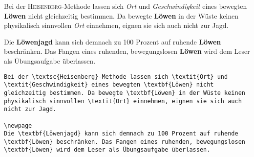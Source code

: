 \begin{frame}[fragile]
	\Losung
	\begin{outputbox}
		Bei der \textsc{Heisenberg}-Methode lassen sich \textit{Ort} und \textit{Geschwindigkeit} eines bewegten \textbf{Löwen} nicht gleichzeitig bestimmen. Da bewegte \textbf{Löwen} in der Wüste keinen physikalisch sinnvollen \textit{Ort} einnehmen, eignen sie sich auch nicht zur Jagd. 
	\end{outputbox}
    \linebreakrule
	\begin{outputbox}
		Die \textbf{Löwenjagd} kann sich demnach zu 100 Prozent auf ruhende \textbf{Löwen} beschränken. Das Fangen eines ruhenden, bewegungslosen \textbf{Löwen} wird dem Leser als Übungsaufgabe überlassen.
	\end{outputbox}

	\Code\btVFill
	\begin{lstlisting}
Bei der \textsc{Heisenberg}-Methode lassen sich \textit{Ort} und \textit{Geschwindigkeit} eines bewegten \textbf{Löwen} nicht gleichzeitig bestimmen. Da bewegte \textbf{Löwen} in der Wüste keinen physikalisch sinnvollen \textit{Ort} einnehmen, eignen sie sich auch nicht zur Jagd. 

\newpage
Die \textbf{Löwenjagd} kann sich demnach zu 100 Prozent auf ruhende \textbf{Löwen} beschränken. Das Fangen eines ruhenden, bewegungslosen \textbf{Löwen} wird dem Leser als Übungsaufgabe überlassen.
	\end{lstlisting}
	\vspace{0.3cm}
\end{frame}
